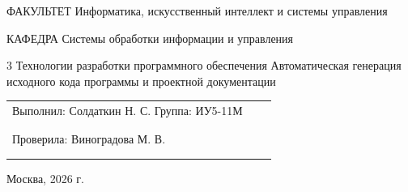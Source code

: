 \newcommand{\baumanAuthors}[3]{%
	\par
	\noindent
	\begingroup
	\setlength{\parindent}{0pt}%
	\setlength{\leftskip}{0pt}%
	\baumanfont
	\mdseries
	\fontsize{12}{14}\selectfont

	\setlength{\tabcolsep}{3pt}%

	\begin{tabularx}{\dimexpr\linewidth-20mm\relax}{%
		@{}
		>{\raggedright\arraybackslash}X
		>{\centering\arraybackslash}p{18mm}
		>{\centering\arraybackslash}p{18mm}
		@{}
		}
		Выполнил: #2\newline
		Группа: #1
		 &
		\shortstack[c]{%
		\rule{16mm}{0.4pt} \\[-1mm]
		{\fontsize{9}{11}\selectfont (подпись)}
		}
		 &
		\shortstack[c]{%
		\rule{16mm}{0.4pt} \\[-1mm]
		{\fontsize{9}{11}\selectfont (дата)}
		}
		\\[10mm]

		Проверила: #3
		 &
		\shortstack[c]{%
		\rule{16mm}{0.4pt} \\[-1mm]
		{\fontsize{9}{11}\selectfont (подпись)}
		}
		 &
		\shortstack[c]{%
		\rule{16mm}{0.4pt} \\[-1mm]
		{\fontsize{9}{11}\selectfont (дата)}
		}
	\end{tabularx}

	\endgroup
	\par
}

\newcommand{\baumanPlace}[2]{%
	\par
	\begingroup
	\centering
	\baumanfont
	\mdseries
	\fontsize{12}{14}\selectfont
	#1, #2 г.%
	\par
	\endgroup
}

\begin{titlepage}
	\thispagestyle{empty}
	\baumanUniversityHeader

	\baumanInfoRow
	{ФАКУЛЬТЕТ}
	{Информатика, искусственный интеллект и системы управления}

	\vspace{4mm}

	\baumanInfoRow
	{КАФЕДРА}
	{Системы обработки информации и управления}

	\vfill

	\baumanLabTitle
	{3}
	{Технологии разработки программного обеспечения}
	{Автоматическая генерация исходного кода программы
	и проектной документации}

	\vfill

	\baumanAuthors
	{ИУ5-11М}
	{Солдаткин Н. С.}
	{Виноградова М. В.}

	\vfill

	\baumanPlace{Москва}{2026}
\end{titlepage}
